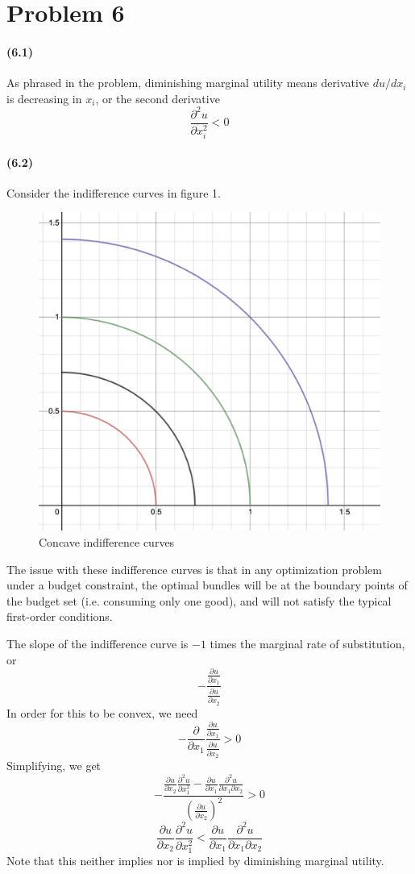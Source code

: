 \documentclass[10pt,letter]{article}
\begin{document}
\section*{Problem 6}
\paragraph{(6.1)}
As phrased in the problem, diminishing marginal utility means derivative $du/dx_i$ is decreasing in $x_i$, or the second derivative
\[ \frac{\partial^2 u}{\partial x_i^2} < 0 \]
\paragraph{(6.2)} Consider the indifference curves in figure 1.
\begin{figure}
\caption{ Concave indifference curves}
\centering
\includegraphics[scale=0.4]{concave_indiff}
\end{figure}

The issue with these indifference curves is that in any optimization problem under a budget constraint, the optimal bundles will be at the boundary points of the budget set (i.e. consuming only one good), and will not satisfy the typical first-order conditions.

The slope of the indifference curve is $-1$ times the marginal rate of substitution, or
\[ - \frac{\frac{\partial u}{\partial x_1}}{\frac{\partial u}{\partial x_2}} \]
In order for this to be convex, we need
 \[ - \frac{\partial}{\partial x_1} \frac{\frac{\partial u}{\partial x_1}}{\frac{\partial u}{\partial x_2}} > 0 \]
 Simplifying, we get
 \[ -  \frac{\frac{\partial u}{\partial x_2}\frac{\partial^2 u}{\partial x_1^2} - \frac{\partial u}{\partial x_1}\frac{\partial^2 u}{\partial x_1 \partial x_2}}{\left( \frac{\partial u}{\partial x_2} \right)^2} > 0 \]
 \[ \frac{\partial u}{\partial x_2}\frac{\partial^2 u}{\partial x_1^2} <  \frac{\partial u}{\partial x_1}\frac{\partial^2 u}{\partial x_1 \partial x_2} \]
 Note that this neither implies nor is implied by diminishing marginal utility.
\end{document}
